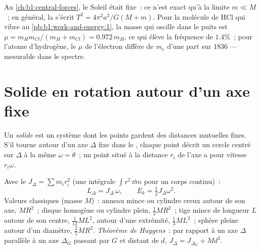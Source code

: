 \begin{example}\label{ex:b1:systems-of-points:reduced}
Au \cref{ch:b1:central-forces}, le Soleil était fixe~: ce n'est exact
qu'à la limite $m \ll M$~; en général, la  s'écrit $T^2 = 4\pi^2a^3/G(M +
m)$. Pour la molécule de HCl qui vibre au \cref{pb:b1:work-and-energy:1},
la masse qui oscille dans le puits est $\mu = m_Hm_{Cl}/(m_H + m_{Cl}) =
0.972\,m_H$, ce qui élève la fréquence de $1.4\%$~; pour l'atome
d'hydrogène, le $\mu$ de l'électron diffère de $m_e$ d'une part sur
$1836$ --- mesurable dans le spectre.
\end{example}

\section{Solide en rotation autour d'un axe fixe}

\begin{definition}\label{def:b1:systems-of-points:solid}
Un \emph{solide} est un système dont les points gardent des distances
mutuelles fixes. S'il tourne autour d'un axe $\Delta$ fixe dans le
, chaque point décrit un cercle centré sur $\Delta$ à la même
 $\omega = \dot\theta$~; un point situé à la distance
$r_i$ de l'axe a pour vitesse $r_i\omega$.
\end{definition}

\begin{proposition}\label{prop:b1:systems-of-points:inertia}
Avec le \emph{} $J_\Delta = \sum m_ir_i^2$ (une intégrale
$\int r^2\,\dd m$ pour un corps continu)~:
\[
L_\Delta = J_\Delta\,\omega, \qquad E_k = \tfrac12 J_\Delta\omega^2 .
\]
Valeurs classiques (masse $M$)~: anneau mince ou cylindre creux autour de
son axe, $MR^2$~; disque homogène ou cylindre plein, $\tfrac12 MR^2$~;
tige mince de longueur $L$ autour de son centre, $\tfrac{1}{12}ML^2$,
autour d'une extrémité, $\tfrac13 ML^2$~; sphère pleine autour d'un
diamètre, $\tfrac25 MR^2$. \emph{Théorème de Huygens}~: par rapport à un
axe $\Delta$ parallèle à un axe $\Delta_G$ passant par $G$ et distant de
$d$, $J_\Delta = J_{\Delta_G} + Md^2$.
\end{proposition}

